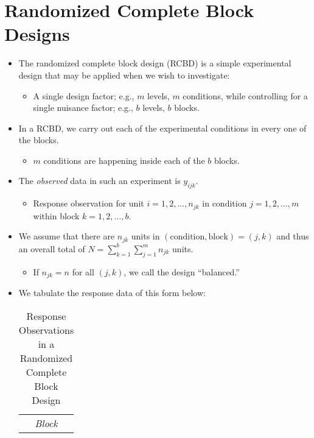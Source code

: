\section{Randomized Complete Block Designs}
\begin{itemize}
    \item The randomized complete block design (RCBD) is a simple experimental design that may be applied
          when we wish to investigate:
          \begin{itemize}
              \item A single design factor; e.g., $ m $ levels, $ m $ conditions, while controlling for a single nuisance factor; e.g., $ b $ levels, $ b $ blocks.
          \end{itemize}
    \item In a RCBD, we carry out each of the experimental conditions in every one of the blocks.
          \begin{itemize}
              \item $ m $ conditions are happening inside each of the $ b $ blocks.
          \end{itemize}
    \item The \emph{observed} data in such an experiment is $ y_{ijk} $.
          \begin{itemize}
              \item Response observation for unit $ i=1,2,\ldots,n_{jk} $ in condition $ j=1,2,\ldots,m $
                    within block $ k=1,2,\ldots,b $.
          \end{itemize}
    \item We assume that there are $n_{jk}$ units in $ (\text{condition}, \text{block}) = (j, k) $ and thus an overall total of
          $ N=\sum_{k=1}^{b} \sum_{j=1}^{m} n_{jk} $ units.
          \begin{itemize}
              \item If $ n_{jk}=n $ for all $ (j,k) $, we call the design ``balanced.''
          \end{itemize}
    \item We tabulate the response data of this form below:
          \begin{table}[!htbp]
              \centering
              \caption{Response Observations in a Randomized Complete Block Design}
              \begin{NiceTabular}{cc|cccc|c}
                         &  &                                                                                                                                                                                                                           \\

\end{NiceTabular}
\end{table}
\end{itemize}
